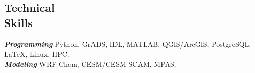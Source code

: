 \documentclass[margin,line]{resume}
\begin{document}
\begin{resume}
%			
%			
			
		
				
				
				
			
			
		
			
			\vspace{-0.4cm}
			\section{\mysidestyle \textbf{\textcolor{sep}{Technical \\Skills}}}
			
			\textbf{\emph{\textcolor{sep}{Programming}}} \hspace{1mm} Python, GrADS, IDL, MATLAB, QGIS/ArcGIS, PostgreSQL,  \LaTeX, Linux, HPC.\\
			\textbf{\emph{\textcolor{sep}{Modeling}}} \hspace{8mm} WRF-Chem, CESM/CESM-SCAM, MPAS.  
			

\end{resume}
\end{document}
